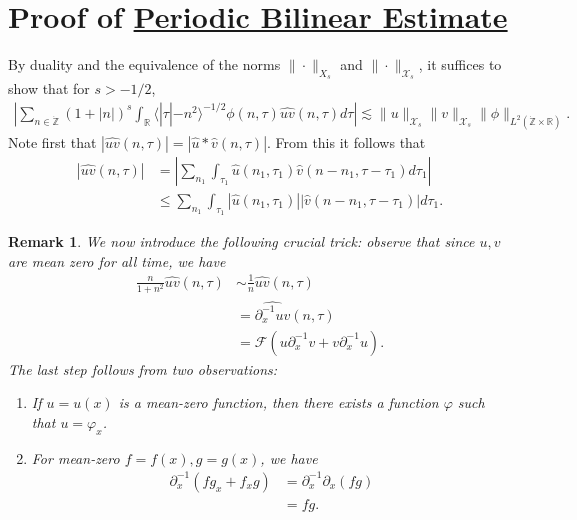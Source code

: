 \documentclass[12pt,reqno]{amsart}
\numberwithin{equation}{section}  %
\newcommand{\rr}{\mathbb{R}}
\newcommand{\zz}{\mathbb{Z}}
\newcommand{\zzdot}{\dot{\zz}}
\newcommand{\wh}{\widehat}
\newcommand{\p}{\partial}
\newtheorem{remark}[theorem]{Remark}
\begin{document}
\section{Proof of \hyperref[prop:bilinear-est]{Periodic Bilinear Estimate}} 
\label{sec:proof-bilin-est}
By duality and the equivalence of the norms $\| \cdot \|_{X_{s}}$ and $\| \cdot \|_{\mathcal{X}_{s}}$, it suffices to show that for $s > -1/2$, 
%
\begin{equation}
	\label{duality-est}
	\begin{split}
	|	\sum_{n \in \zzdot}  (1 + |n|)^{s}
	\int_{\rr} \langle | \tau | - n^{2}  \rangle ^{-1/2}\phi(n, \tau) \wh{uv}(n, \tau) d \tau | \lesssim \|u\|_{\mathcal{X}_{s}}
    \|v\|_{\mathcal{X}_{s}}
    \|\phi \|_{L^{2}(\zzdot \times \rr)}.
	\end{split}
\end{equation}
Note first that $|\wh{uv}(n, \tau) |  = | \wh{u} *  \wh{v} 
(n, \tau)|$. From this it follows that
%
%
\begin{equation}
	\label{non-lin-rep}
	\begin{split}
		| \wh{uv}(n, \tau)|
    & = | \sum_{n_{1}}  \int_{\tau_{1}}
    \wh{u}\left( n_1,  \tau_1 \right) \wh{v}\left( n - n_1 , \tau - \tau_1   
\right) d \tau_1 |
\\
& \le  \sum_{n_{1}}  \int_{\tau_{1}}
    |\wh{u}\left( n_1,  \tau_1 \right)| |\wh{v}\left( n - n_1 , \tau - \tau_1   
\right)| d \tau_1.
\end{split}
\end{equation}
%
\begin{framed}
\begin{remark}
\label{rem:key-trick}
We now introduce the following crucial trick: observe that since $u, v$ are mean zero for all time, we have 
%
%
%
\begin{equation*}
\begin{split}
\frac{n}{1 + n^{2}} \wh{uv}(n, \tau) 
& \sim \frac{1}{n} \wh{uv}(n, \tau)
\\
& = \wh{\p_{x}^{-1} uv}(n, \tau)
\\
& = \mathcal{F}(u \p_{x}^{-1}v + v \p_{x}^{-1} u).
\end{split}
\end{equation*}
%
The last step follows from two observations: 
\begin{enumerate}
\item{} If $u = u(x)$ is a mean-zero function, then there exists a function $\varphi$ such that $u = \varphi_{x}$.  
\item{} For mean-zero $f=f(x),g=g(x)$, we have
%
%
\begin{equation*}
\begin{split}
\p_{x}^{-1}(fg_{x} + f_{x}g) 
& = \p_{x}^{-1} \p_{x}(fg)
\\
&= fg.
\end{split}
\end{equation*}
%
\end{enumerate}
\end{remark}
\end{framed}
\end{document}

